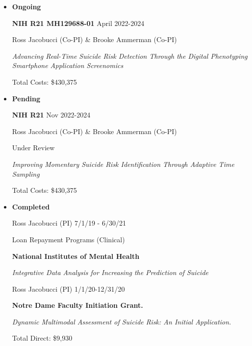 \documentclass[letterpaper,10pt]{article}
\begin{document}
\begin{itemize} 
	\setlength{\topsep}{0pt}%
	\setlength{\leftmargin}{0.1in}%
	\setlength{\listparindent}{-0.1in}%
	\setlength{\itemindent}{-0.2in}%
	\setlength{\parsep}{\parskip}%
	
	\item {\textbf{\large{Ongoing}}}
	
	\begin{center}
		\parbox{6.5in}{\textbf{NIH R21 MH129688-01}  \hspace{8cm} April 2022-2024}
		\parbox{6.5in}{{Ross Jacobucci (Co-PI) \& Brooke Ammerman (Co-PI)}  }
		\parbox{6.5in}{\textit{Advancing Real-Time Suicide Risk Detection Through the Digital Phenotyping Smartphone Application Screenomics}}
		\parbox{6.5in}{Total Costs: \$430,375}
	\end{center}
	

	\item {\textbf{\large{Pending}}}



\begin{center}
	\parbox{6.5in}{\textbf{NIH R21 }  \hspace{10.5cm} Nov 2022-2024}
	\parbox{6.5in}{{Ross Jacobucci (Co-PI) \& Brooke Ammerman (Co-PI)}  }
	\parbox{6.5in} {Under Review}
	\parbox{6.5in}{\textit{Improving Momentary Suicide Risk Identification Through Adaptive Time Sampling}}
	\parbox{6.5in}{Total Costs: \$430,375}
\end{center}

	\item{\textbf{\large{Completed}}}
	
		\begin{center}
		\parbox{6.5in}{{Ross Jacobucci (PI) }   \hspace{9cm} 7/1/19 - 6/30/21}
		\parbox{6.5in}{Loan Repayment Programs (Clinical)}
		\parbox{6.5in}{\textbf{National Institutes of Mental Health} }
		\parbox{6.5in}{\textit{Integrative Data Analysis for Increasing the Prediction of Suicide}}
	\end{center}
	
		\begin{center}
		\parbox{6.5in}{{Ross Jacobucci (PI)}   \hspace{9.2cm} 1/1/20-12/31/20}
		\parbox{6.5in}{\textbf{Notre Dame Faculty Initiation Grant.} }
		\parbox{6.5in}{\textit{Dynamic Multimodal Assessment of Suicide Risk: An Initial Application.}}
		\parbox{6.5in}{Total Direct: \$9,930}
	\end{center}
	

\end{itemize}
\end{document}
